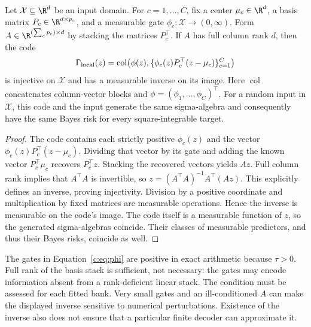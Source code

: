 \begin{proposition}
\label{c:prop:local-injectivity}
Let $\mathcal X\subseteq\R^d$ be an input domain. For
$c=1,\ldots,C$, fix a center $\mu_c\in\R^d$, a basis matrix
$P_c\in\R^{d\times p_c}$, and a measurable gate
$\phi_c:\mathcal X\to(0,\infty)$. Form
$A\in\R^{(\sum_c p_c)\times d}$ by stacking the matrices $P_c^\top$.
If $A$ has full column rank $d$, then the code
\[
 \Gamma_{\rm local}(z)=\operatorname{col}\!\left(
 \phi(z),\{\phi_c(z)P_c^\top(z-\mu_c)\}_{c=1}^{C}\right)
\]
is injective on $\mathcal X$ and has a measurable inverse on its image.
Here $\operatorname{col}$ concatenates column-vector blocks and
$\phi=(\phi_1,\ldots,\phi_C)^\top$. For a random input in
$\mathcal X$, this code and the input generate the same sigma-algebra
and consequently have the same Bayes risk for every square-integrable
target.
\end{proposition}
\begin{proof}
The code contains each strictly positive $\phi_c(z)$ and the vector
$\phi_c(z)P_c^\top(z-\mu_c)$. Dividing that vector by its gate and
adding the known vector $P_c^\top\mu_c$ recovers $P_c^\top z$.
Stacking the recovered vectors yields $Az$. Full column rank implies
that $A^\top A$ is invertible, so
$z=(A^\top A)^{-1}A^\top(Az)$. This explicitly defines an inverse,
proving injectivity. Division by a positive coordinate and multiplication
by fixed matrices are measurable operations. Hence the inverse is
measurable on the code's image. The code itself is a measurable function
of $z$, so the generated sigma-algebras coincide. Their classes of
measurable predictors, and thus their Bayes risks, coincide as well.
\end{proof}

The gates in Equation~\eqref{c:eq:phi} are positive in exact arithmetic
because $\tau>0$. Full rank of the basis stack is sufficient, not
necessary: the gates may encode information absent from a rank-deficient
linear stack. The condition must be assessed for each fitted bank.
Very small gates and an ill-conditioned $A$ can make the displayed
inverse sensitive to numerical perturbations. Existence of the inverse
also does not ensure that a particular finite decoder can approximate it.

